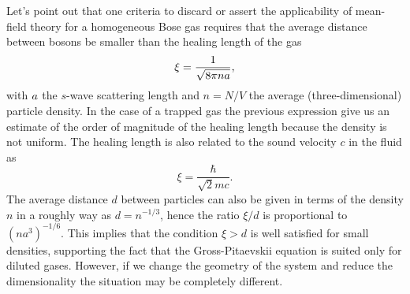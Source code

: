 Let's point out that one criteria to discard or assert the applicability of
mean-field theory for a homogeneous Bose gas requires that the average distance
between bosons be smaller than the healing length of the gas
%
\begin{equation}
  \label{eq:healing-length}
  \xi = \frac{1}{\sqrt{8 \pi n a}},
\end{equation}
%
with $a$ the $s$-wave scattering length and $n = N/V$ the average
(three-dimensional) particle density. In the case of a trapped gas the previous
expression give us an estimate of the order of magnitude of the healing length
because the density is not uniform. The healing length is also related to the
sound velocity $c$ in the fluid as
%
\begin{equation}
  \label{eq:healing-length-sound-velocity}
  \xi = \frac{\hbar}{\sqrt{2} m c}.
\end{equation}
The average distance $d$ between particles can also be given in terms of the
density $n$ in a roughly way as $d = n^{-1/3}$, hence the ratio $\xi / d$ is
proportional to $(na^3)^{-1/6}$. This implies that the condition $\xi > d$ is
well satisfied for small densities, supporting the fact that the
Gross-Pitaevskii equation is suited only for diluted gases. However, if we
change the geometry of the system and reduce the dimensionality the situation
may be completely different.


